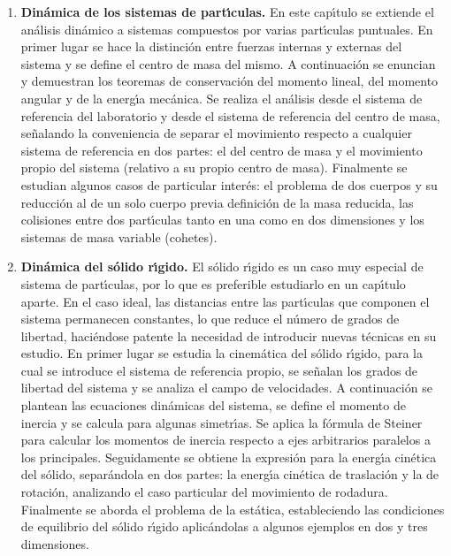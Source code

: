 \begin{enumerate} [{\bf 1. }]
\item {\bf Din\'{a}mica de los sistemas de part\'{\i}culas.}
En este cap\'{\i}tulo se extiende el an\'{a}lisis din\'{a}mico a sistemas
 compuestos por varias part\'{\i}culas puntuales. En primer lugar se hace 
la distinci\'{o}n entre fuerzas internas y externas del sistema y se define el 
centro de masa del mismo. A continuaci\'{o}n se enuncian y demuestran los teoremas 
de conservaci\'{o}n del momento lineal, del momento angular y de la energ\'{\i}a
 mec\'{a}nica. Se realiza el an\'{a}lisis desde el sistema de referencia 
del laboratorio y desde el sistema de referencia del centro de masa, 
se\~{n}alando la conveniencia de separar el movimiento respecto a cualquier
 sistema de referencia en dos partes: el del centro de masa y el movimiento propio 
del sistema (relativo a su propio centro de masa). 
Finalmente se estudian algunos casos de particular inter\'{e}s:
 el problema de dos cuerpos y su reducci\'{o}n al de un solo cuerpo previa
 definici\'{o}n de la masa reducida, 
las colisiones entre dos part\'{\i}culas tanto en una como en dos dimensiones
 y los sistemas de masa variable (cohetes).

\item {\bf  Din\'{a}mica del s\'{o}lido r\'{\i}gido.}
El s\'{o}lido r\'{\i}gido es un caso muy especial de sistema de part\'{\i}culas,
 por lo que es preferible estudiarlo en un cap\'{\i}tulo aparte. En el caso ideal,
 las distancias entre las part\'{\i}culas que componen el sistema permanecen 
constantes, lo que reduce el n\'{u}mero de grados de libertad, haci\'{e}ndose 
patente la necesidad de introducir nuevas t\'{e}cnicas en su estudio.
 En primer lugar se estudia la cinem\'{a}tica del s\'{o}lido r\'{\i}gido, para la 
cual se introduce el sistema de referencia propio, se se\~{n}alan los
 grados de libertad del sistema y se analiza el campo de velocidades. 
A continuaci\'{o}n se plantean las ecuaciones din\'{a}micas del sistema, 
se define el momento de inercia y  se calcula para algunas simetr\'{\i}as. 
Se aplica la f\'{o}rmula de Steiner para calcular los momentos de inercia 
respecto a ejes arbitrarios paralelos a los principales. 
Seguidamente se obtiene la expresi\'{o}n para la energ\'{\i}a cin\'{e}tica del
 s\'{o}lido, separ\'{a}ndola en dos partes: la energ\'{\i}a cin\'{e}tica de 
traslaci\'{o}n 
y la de rotaci\'{o}n, analizando el caso particular del movimiento de rodadura. 
Finalmente se aborda el problema de la est\'{a}tica, estableciendo las condiciones
 de equilibrio del s\'{o}lido r\'{\i}gido  aplic\'{a}ndolas a algunos ejemplos en dos
 y tres dimensiones.


\end{enumerate}
